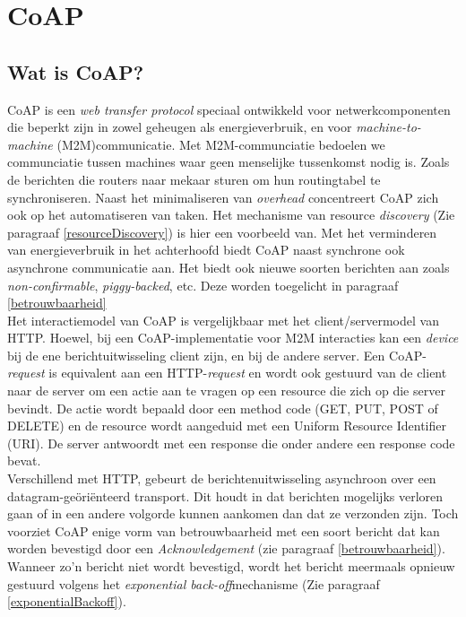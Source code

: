 \chapter{CoAP} \label{CoAP}

\section{Wat is CoAP?}

CoAP is een \textit{web transfer protocol} speciaal ontwikkeld voor netwerkcomponenten die beperkt zijn in zowel geheugen als energieverbruik, en voor \textit{machine-to-machine} (M2M)communicatie. Met M2M-communciatie bedoelen we communciatie tussen machines waar geen menselijke tussenkomst nodig is. Zoals de berichten die routers naar mekaar sturen om hun routingtabel te synchroniseren. Naast het minimaliseren van \textit{overhead} concentreert CoAP zich ook op het automatiseren van taken. Het mechanisme van resource \textit{discovery} (Zie paragraaf \ref{resourceDiscovery}) is hier een voorbeeld van. Met het verminderen van energieverbruik in het achterhoofd biedt CoAP naast synchrone ook asynchrone communicatie aan. Het biedt ook nieuwe soorten berichten aan zoals \textit{non-confirmable}, \textit{piggy-backed}, etc. Deze worden toegelicht in paragraaf \ref{betrouwbaarheid}\\


Het interactiemodel van CoAP is vergelijkbaar met het client/servermodel van HTTP. Hoewel, bij een CoAP-implementatie voor M2M interacties kan een \textit{device} bij de ene berichtuitwisseling client zijn, en bij de andere server. Een CoAP-\textit{request} is equivalent aan een HTTP-\textit{request} en wordt ook gestuurd van de client naar de server om een actie aan te vragen op een resource die zich op die server bevindt. De actie wordt bepaald door een method code (GET, PUT, POST of DELETE) en de resource wordt aangeduid met een Uniform Resource Identifier (URI). De server antwoordt met een response die onder andere een response code bevat.\\

Verschillend met HTTP, gebeurt de berichtenuitwisseling asynchroon over een datagram-ge\"{o}ri\"{e}nteerd transport. Dit houdt in dat berichten mogelijks verloren gaan of in een andere volgorde kunnen aankomen dan dat ze verzonden zijn. Toch voorziet CoAP enige vorm van betrouwbaarheid met een soort bericht dat kan worden bevestigd door een \textit{Acknowledgement} (zie paragraaf \ref{betrouwbaarheid}). Wanneer zo'n bericht niet wordt bevestigd, wordt het bericht meermaals opnieuw gestuurd volgens het \textit{exponential back-off}mechanisme (Zie paragraaf \ref{exponentialBackoff}).

